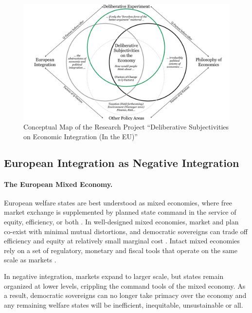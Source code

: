 \documentclass[11pt,a4paper,oneside,english]{article}
\begin{document}
\begin{landscape}
 \begin{figure}[htbp]
    \begin{center}
	\includegraphics[width=1\linewidth]{img/deliberative-subjectivities}
	\caption{Conceptual Map of the Research Project ``Deliberative Subjectivities on Economic Integration (In the EU)''}
	\label{fig:deliberative-subjectivities}
	\end{center}
\end{figure}
\end{landscape}

\subsection[European Integration]{European Integration as Negative Integration} \label{sec:european-integration}


\paragraph{The European Mixed Economy.}

European welfare states are best understood as mixed economies, where free market exchange is supplemented by planned state command in the service of equity, efficiency, or both \parencite{MusgThet1959}.
In well-designed mixed economies, market and plan co-exist with minimal mutual distortions, and democratic sovereigns can trade off efficiency and equity at relatively small marginal cost \parencite[4]{Bordo2011}.
Intact mixed economies rely on a set of regulatory, monetary and fiscal tools that operate on the same scale as markets \parencite{Samuelson-1954-eu,Samuelson2005}.

In negative integration, markets expand to larger scale, but states remain organized at lower levels, crippling the command tools of the mixed economy.
As a result, democratic sovereigns can no longer take primacy over the economy and any remaining welfare states will be inefficient, inequitable, unsustainable or all.
\end{document}
